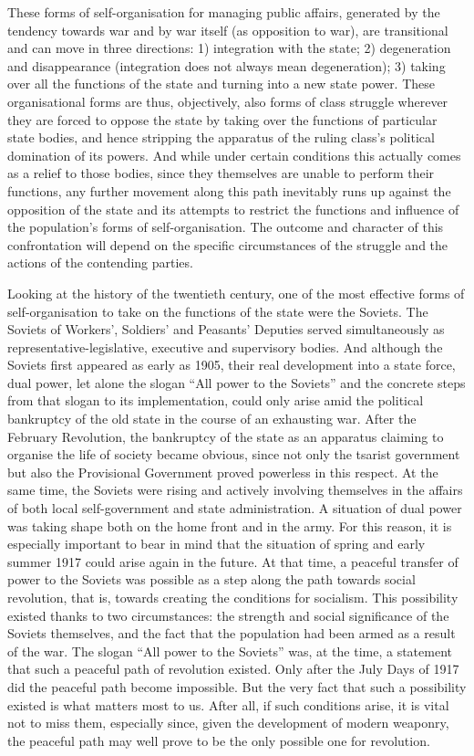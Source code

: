 \documentclass[../main]{subfiles}
\begin{document}
These forms of self-organisation for managing public affairs, generated by the tendency towards war and by war itself (as opposition to war), are transitional and can move in three directions: 1) integration with the state; 2) degeneration and disappearance (integration does not always mean degeneration); 3) taking over all the functions of the state and turning into a new state power. These organisational forms are thus, objectively, also forms of class struggle wherever they are forced to oppose the state by taking over the functions of particular state bodies, and hence stripping the apparatus of the ruling class’s political domination of its powers. And while under certain conditions this actually comes as a relief to those bodies, since they themselves are unable to perform their functions, any further movement along this path inevitably runs up against the opposition of the state and its attempts to restrict the functions and influence of the population’s forms of self-organisation. The outcome and character of this confrontation will depend on the specific circumstances of the struggle and the actions of the contending parties.

Looking at the history of the twentieth century, one of the most effective forms of self-organisation to take on the functions of the state were the Soviets. The Soviets of Workers’, Soldiers’ and Peasants’ Deputies served simultaneously as representative-legislative, executive and supervisory bodies. And although the Soviets first appeared as early as 1905, their real development into a state force, dual power, let alone the slogan “All power to the Soviets” and the concrete steps from that slogan to its implementation, could only arise amid the political bankruptcy of the old state in the course of an exhausting war. After the February Revolution, the bankruptcy of the state as an apparatus claiming to organise the life of society became obvious, since not only the tsarist government but also the Provisional Government proved powerless in this respect. At the same time, the Soviets were rising and actively involving themselves in the affairs of both local self-government and state administration. A situation of dual power was taking shape both on the home front and in the army. For this reason, it is especially important to bear in mind that the situation of spring and early summer 1917 could arise again in the future. At that time, a peaceful transfer of power to the Soviets was possible as a step along the path towards social revolution, that is, towards creating the conditions for socialism. This possibility existed thanks to two circumstances: the strength and social significance of the Soviets themselves, and the fact that the population had been armed as a result of the war. The slogan “All power to the Soviets” was, at the time, a statement that such a peaceful path of revolution existed. Only after the July Days of 1917 did the peaceful path become impossible. But the very fact that such a possibility existed is what matters most to us. After all, if such conditions arise, it is vital not to miss them, especially since, given the development of modern weaponry, the peaceful path may well prove to be the only possible one for revolution.
\end{document}

